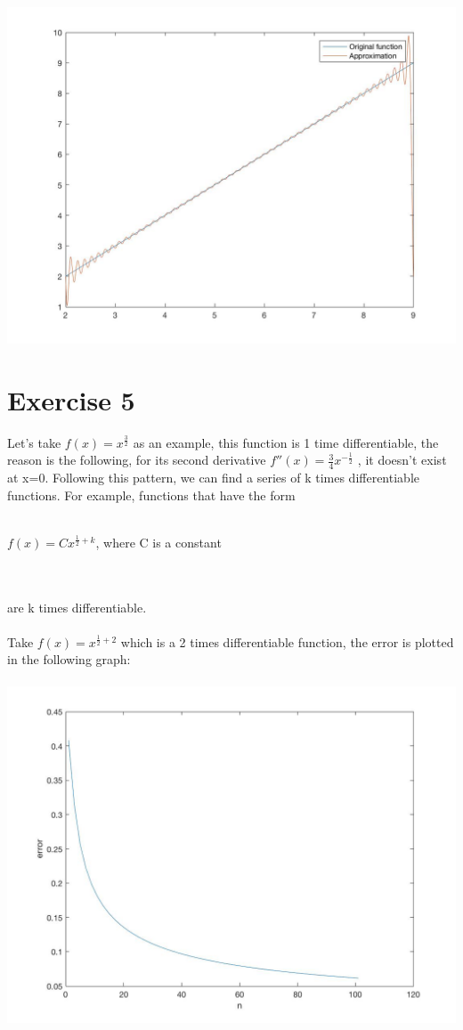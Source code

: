 \documentclass[11pt]{article} %
\begin{document}
\includegraphics[scale=0.3]{e41.jpg}
\section{Exercise 5}
Let's take $f(x) = x^{\frac{3}{2}}$ as an example, this function is 1 time differentiable, the reason is the following, for its second derivative $f''(x) = \frac{3}{4}x^{-\frac{1}{2}}$ , it doesn't exist at x=0. Following this pattern, we can find a series of k times differentiable functions. For example, functions that have the form\\\\
\centerline{$f(x) = Cx^{\frac{1}{2}+k}$, where C is a constant}\\\\
are k times differentiable.\\\\
Take $f(x) =x^{\frac{1}{2}+2}$ which is a 2 times differentiable function, the error is plotted in the following graph:\\\\
\includegraphics[scale=0.3]{e51.jpg}
\end{document}
